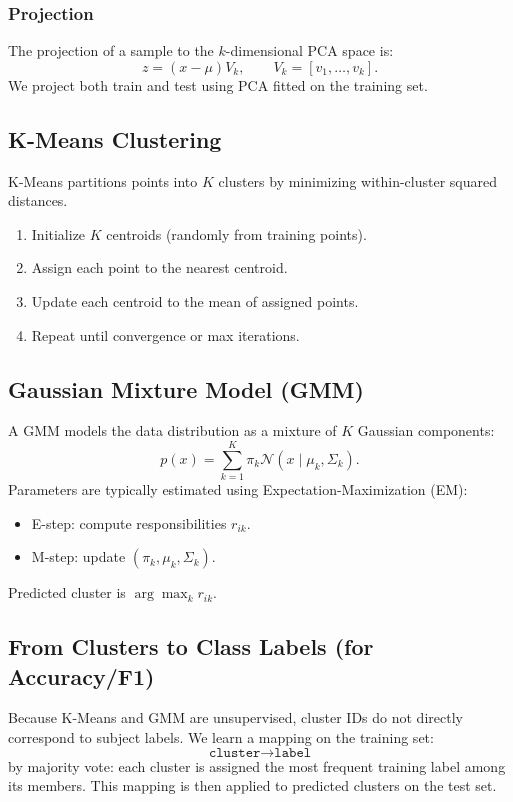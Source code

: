 \documentclass[11pt,a4paper]{article}
\begin{document}
\subsubsection{Projection}
The projection of a sample to the $k$-dimensional PCA space is:
\begin{equation}
 z = (x - \mu) V_k, \qquad V_k = [v_1,\dots,v_k].
\end{equation}
We project both train and test using PCA fitted on the training set.

\subsection{K-Means Clustering}
K-Means partitions points into $K$ clusters by minimizing within-cluster squared distances.
\begin{enumerate}
    \item Initialize $K$ centroids (randomly from training points).
    \item Assign each point to the nearest centroid.
    \item Update each centroid to the mean of assigned points.
    \item Repeat until convergence or max iterations.
\end{enumerate}

\subsection{Gaussian Mixture Model (GMM)}
A GMM models the data distribution as a mixture of $K$ Gaussian components:
\begin{equation}
 p(x) = \sum_{k=1}^K \pi_k \mathcal{N}(x \mid \mu_k, \Sigma_k).
\end{equation}
Parameters are typically estimated using Expectation-Maximization (EM):
\begin{itemize}
    \item E-step: compute responsibilities $r_{ik}$.
    \item M-step: update $(\pi_k, \mu_k, \Sigma_k)$.
\end{itemize}
Predicted cluster is $\arg\max_k r_{ik}$.

\subsection{From Clusters to Class Labels (for Accuracy/F1)}
Because K-Means and GMM are unsupervised, cluster IDs do not directly correspond to subject labels. We learn a mapping on the training set:
\begin{equation}
\texttt{cluster} \rightarrow \texttt{label}
\end{equation}
by majority vote: each cluster is assigned the most frequent training label among its members. This mapping is then applied to predicted clusters on the test set.
\end{document}
